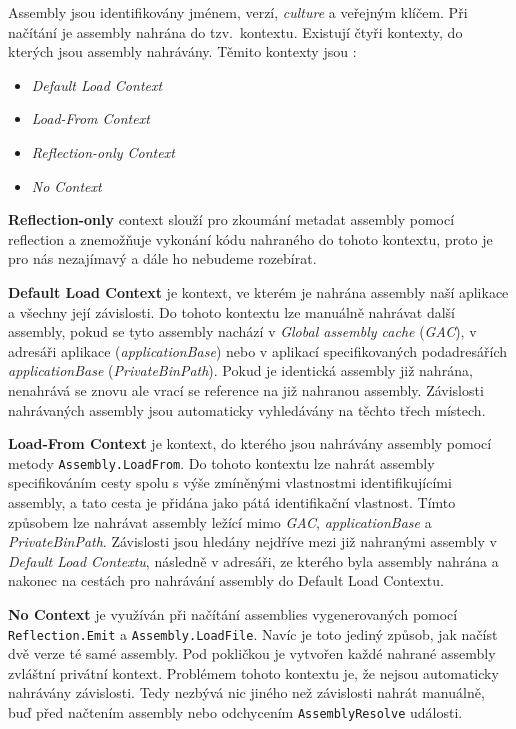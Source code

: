 Assembly jsou identifikovány jménem, verzí, \textit{culture} a veřejným klíčem. 
Při načítání je assembly nahrána do tzv.~kontextu. Existují čtyři kontexty, do kterých jsou assembly nahrávány. Těmito kontexty jsou \citep{site:assemblyload}:
\begin{itemize}
	\item \textit{Default Load Context}
	\item \textit{Load-From Context}
	\item \textit{Reflection-only Context}
	\item \textit{No Context}
\end{itemize}

\textbf{Reflection-only} context slouží pro zkoumání metadat assembly pomocí reflection a znemožňuje vykonání kódu nahraného do tohoto kontextu, proto je pro nás nezajímavý a dále ho nebudeme rozebírat.

\textbf{Default Load Context} je kontext, ve kterém je nahrána assembly naší aplikace a všechny její závislosti. Do tohoto kontextu lze manuálně nahrávat další assembly, pokud se tyto assembly nachází v \textit{Global assembly cache} (\emph{GAC}), v adresáři aplikace (\textit{applicationBase}) nebo v aplikací specifikovaných podadresářích \textit{applicationBase} (\textit{PrivateBinPath}). Pokud je identická assembly již nahrána, nenahrává se znovu ale vrací se reference na již nahranou assembly. Závislosti nahrávaných assembly jsou automaticky vyhledávány na těchto třech místech.

\textbf{Load-From Context} je kontext, do kterého jsou nahrávány assembly pomocí metody \texttt{Assembly.LoadFrom}. Do tohoto kontextu lze nahrát assembly specifikováním cesty spolu s výše zmíněnými vlastnostmi identifikujícími assembly, a tato cesta je přidána jako pátá identifikační vlastnost. Tímto způsobem lze nahrávat assembly ležící mimo \emph{GAC}, \textit{applicationBase} a \textit{PrivateBinPath}. Závislosti jsou hledány nejdříve mezi již nahranými assembly v \textit{Default Load Contextu}, následně v adresáři, ze kterého byla assembly nahrána a nakonec na cestách pro nahrávání assembly do Default Load Contextu.

\textbf{No Context} je využíván při načítání  assemblies vygenerovaných pomocí \texttt{Reflection.Emit} a \texttt{Assembly.LoadFile}. Navíc je toto jediný způsob, jak načíst dvě verze té samé assembly. Pod pokličkou je vytvořen každé nahrané assembly zvláštní privátní kontext. Problémem tohoto kontextu je, že nejsou automaticky nahrávány závislosti. Tedy nezbývá nic jiného než závislosti nahrát manuálně, buď před načtením assembly nebo odchycením \texttt{AssemblyResolve} události.

